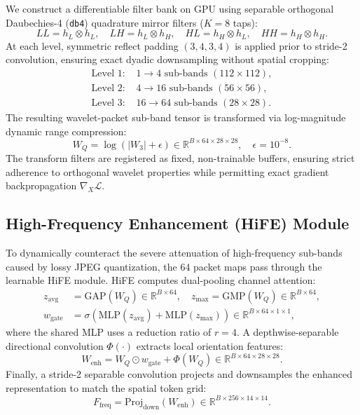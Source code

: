 \documentclass[11pt,a4paper]{article}
\begin{document}
We construct a differentiable filter bank on GPU using separable orthogonal Daubechies-4 (\texttt{db4}) quadrature mirror filters ($K=8$ taps):
\begin{equation}
LL = h_L \otimes h_L, \quad LH = h_L \otimes h_H, \quad HL = h_H \otimes h_L, \quad HH = h_H \otimes h_H.
\end{equation}
At each level, symmetric reflect padding $(3, 4, 3, 4)$ is applied prior to stride-2 convolution, ensuring exact dyadic downsampling without spatial cropping:
\begin{align}
\text{Level 1: } & 1 \to 4 \text{ sub-bands } (112 \times 112), \\
\text{Level 2: } & 4 \to 16 \text{ sub-bands } (56 \times 56), \\
\text{Level 3: } & 16 \to 64 \text{ sub-bands } (28 \times 28).
\end{align}
The resulting wavelet-packet sub-band tensor is transformed via log-magnitude dynamic range compression:
\begin{equation}
W_Q = \log(|W_3| + \epsilon) \in \mathbb{R}^{B \times 64 \times 28 \times 28}, \quad \epsilon = 10^{-8}.
\end{equation}
The transform filters are registered as fixed, non-trainable buffers, ensuring strict adherence to orthogonal wavelet properties while permitting exact gradient backpropagation $\nabla_X \mathcal{L}$.

\subsection{High-Frequency Enhancement (HiFE) Module}
To dynamically counteract the severe attenuation of high-frequency sub-bands caused by lossy JPEG quantization, the 64 packet maps pass through the learnable HiFE module. HiFE computes dual-pooling channel attention:
\begin{align}
z_{\text{avg}} &= \text{GAP}(W_Q) \in \mathbb{R}^{B \times 64}, \quad z_{\text{max}} = \text{GMP}(W_Q) \in \mathbb{R}^{B \times 64}, \\
w_{\text{gate}} &= \sigma\left(\text{MLP}(z_{\text{avg}}) + \text{MLP}(z_{\text{max}})\right) \in \mathbb{R}^{B \times 64 \times 1 \times 1},
\end{align}
where the shared MLP uses a reduction ratio of $r=4$. A depthwise-separable directional convolution $\Phi(\cdot)$ extracts local orientation features:
\begin{equation}
W_{\text{enh}} = W_Q \odot w_{\text{gate}} + \Phi(W_Q) \in \mathbb{R}^{B \times 64 \times 28 \times 28}.
\end{equation}
Finally, a stride-2 separable convolution projects and downsamples the enhanced representation to match the spatial token grid:
\begin{equation}
F_{\text{freq}} = \text{Proj}_{\text{down}}(W_{\text{enh}}) \in \mathbb{R}^{B \times 256 \times 14 \times 14}.
\end{equation}
\end{document}
